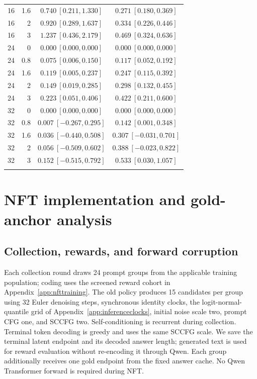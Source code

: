 \documentclass{article}
\begin{document}
\begin{table}[htbp]
\begin{tabular}{@{}rrcc@{}}
16 & 1.6 & $0.740\ [0.211, 1.330]$ & $0.271\ [0.180, 0.369]$ \\
16 & 2 & $0.920\ [0.289, 1.637]$ & $0.334\ [0.226, 0.446]$ \\
16 & 3 & $1.237\ [0.436, 2.179]$ & $0.469\ [0.324, 0.636]$ \\
24 & 0 & $0.000\ [0.000, 0.000]$ & $0.000\ [0.000, 0.000]$ \\
24 & 0.8 & $0.075\ [0.006, 0.150]$ & $0.117\ [0.052, 0.192]$ \\
24 & 1.6 & $0.119\ [0.005, 0.237]$ & $0.247\ [0.115, 0.392]$ \\
24 & 2 & $0.149\ [0.019, 0.285]$ & $0.298\ [0.132, 0.455]$ \\
24 & 3 & $0.223\ [0.051, 0.406]$ & $0.422\ [0.211, 0.600]$ \\
32 & 0 & $0.000\ [0.000, 0.000]$ & $0.000\ [0.000, 0.000]$ \\
32 & 0.8 & $0.007\ [-0.267, 0.295]$ & $0.142\ [0.001, 0.348]$ \\
32 & 1.6 & $0.036\ [-0.440, 0.508]$ & $0.307\ [-0.031, 0.701]$ \\
32 & 2 & $0.056\ [-0.509, 0.602]$ & $0.388\ [-0.023, 0.822]$ \\
32 & 3 & $0.152\ [-0.515, 0.792]$ & $0.533\ [0.030, 1.057]$ \\
\addlinespace
\bottomrule
\end{tabular}
\end{table}

\section{NFT implementation and gold-anchor analysis}
\label{app:nftdetails}

\subsection{Collection, rewards, and forward corruption}

Each collection round draws 24 prompt groups from the applicable training population; coding uses the screened reward cohort in Appendix~\ref{app:nfttraining}. The old policy produces 15 candidates per group using 32 Euler denoising steps, synchronous identity clocks, the logit-normal-quantile grid of Appendix~\ref{app:inferenceclocks}, initial noise scale two, prompt CFG one, and SCCFG two. Self-conditioning is recurrent during collection. Terminal token decoding is greedy and uses the same SCCFG scale. We save the terminal latent endpoint and its decoded answer length; generated text is used for reward evaluation without re-encoding it through Qwen. Each group additionally receives one gold endpoint from the fixed answer cache. No Qwen Transformer forward is required during NFT.
\end{document}
